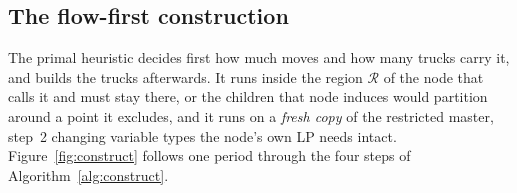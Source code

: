 \subsection{The flow-first construction}
\label{sec:relaxfix-flow}

The primal heuristic decides first how much moves and how many trucks
carry it, and builds the trucks afterwards. It runs inside the region
$\mathcal{R}$ of the node that calls it and must stay there, or the
children that node induces would partition around a point it excludes,
and it runs on a \emph{fresh copy} of the restricted master, step~2
changing variable types the node's own LP needs intact.
Figure~\ref{fig:construct} follows one period through the four steps of
Algorithm~\ref{alg:construct}.



